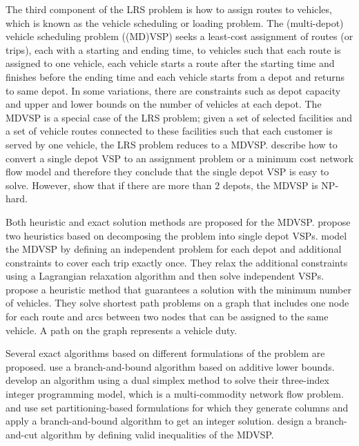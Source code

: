 The third component of the LRS problem is how to assign routes to vehicles, which is known 
as the vehicle scheduling or loading problem. The (multi-depot) vehicle scheduling problem 
((MD)VSP) seeks a least-cost assignment of routes (or trips), each with a starting and 
ending time, to vehicles such that each route is assigned to one vehicle, each vehicle 
starts a route after the starting time and finishes before the ending time and each vehicle 
starts from a depot and returns to same depot. In some variations, there are constraints 
such as depot capacity and upper and lower bounds on the number of vehicles at each depot. 
The MDVSP is a special case of the LRS problem; given a set of selected facilities and a 
set of vehicle routes connected to these facilities such that each customer is served by 
one vehicle, the LRS problem reduces to a MDVSP.  \citet{Carraresi} describe how to convert 
a single depot VSP to an assignment problem or a minimum cost network flow model 
and therefore they conclude that the single depot VSP is easy to solve. However, \citet{Bertossi} 
show that if there are more than 2 depots, the MDVSP is NP-hard. 
 
Both heuristic and exact solution methods are proposed for the MDVSP. \citet{Bodin} 
propose two heuristics based on decomposing the problem into single depot VSPs.  
\citet{Bertossi} model the MDVSP by defining an independent problem for each depot and 
additional constraints to cover each trip exactly once. They relax the additional constraints 
using a Lagrangian relaxation algorithm and then solve independent VSPs. 
\citet{DellAmico} propose a heuristic method that guarantees a solution with the minimum 
number of vehicles. They solve shortest path problems on a graph that includes one 
node for each route and arcs between two nodes that can be assigned to the same 
vehicle. A path on the graph represents a vehicle duty.  
 
Several exact algorithms based on different formulations of the problem are 
proposed. \citet{Carpaneto} use a branch-and-bound algorithm based on additive lower 
bounds. \citet{Forbes} develop an algorithm using a dual simplex method to solve their 
three-index integer programming model, which is a multi-commodity network flow problem. 
\citet{Ribeiro} and \citet{Bianco} use set partitioning-based formulations for which 
they generate columns and apply a branch-and-bound algorithm to get an integer solution. 
\citet{Fischetti} design a branch-and-cut algorithm by defining valid inequalities of the MDVSP.  

